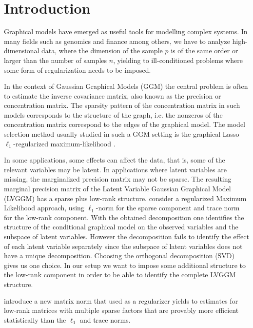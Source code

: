 \section{Introduction}
\label{intro}


Graphical models have emerged as useful tools for modelling complex systems. In many fields such as genomics and finance among others, we have to analyze high-dimensional data, where the dimension of the sample $p$ is of the same order or larger than the number of samples $n$, yielding to ill-conditioned problems where some form of regularization needs to be imposed.

In the context of Gaussian Graphical Models (GGM) the central problem is often to estimate the inverse covariance matrix, also known as the precision or concentration matrix. The sparsity pattern of the concentration matrix in such models corresponds to the structure of the graph, i.e. the nonzeros of the concentration matrix correspond to the edges of the graphical model. The model selection method usually studied in such a GGM setting is the graphical Lasso $\ell_1$-regularized maximum-likelihood \citep{friedman2008sparse,yuan2007model,banerjee2008model}.

In some applications, some effects can affect the data, that is, some of the relevant variables may be latent. In applications where latent variables are missing, the marginalized precision matrix may not be sparse. The resulting marginal precision matrix of the Latent Variable Gaussian Graphical Model (LVGGM) has a sparse plus low-rank structure. \citet{chandrasekaran2010} consider a regularized Maximum Likelihood approach, using $\ell_1$-norm for the sparse component and trace norm for the low-rank component. With the obtained decomposition one identifies the structure of the conditional graphical model on the observed variables and the subspace of latent variables. However the decomposition fails to identify the effect of each latent variable separately since the subspace of latent variables does not have a unique decomposition. Choosing the orthogonal decomposition (SVD) gives us one choice. In our setup we want to impose some additional structure to the low-rank component in order to be able to identify the complete LVGGM structure.  

\citet{richard2014tight} introduce a new matrix norm that used as a regularizer yields to  estimates for low-rank matrices with multiple sparse factors that are provably more efficient statistically than the $\ell_1$ and trace norms.

